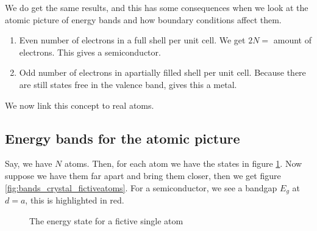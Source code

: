 We do get the same results, and this has some consequences when we look at the atomic picture of energy bands and how boundary conditions affect them.
\begin{enumerate}
	\setlength\itemsep{0pt}
	\item Even number of electrons in a full shell per unit cell. We get $2N =$ amount of electrons. This gives a semiconductor.
	\item Odd number of electrons in apartially filled shell per unit cell. Because there are still states free in the valence band, gives this a metal.
\end{enumerate}
We now link this concept to real atoms.

\subsection{Energy bands for the atomic picture}
Say, we have $N$ atoms. Then, for each atom we have the states in figure \ref{fig:state_one_atom}. Now suppose we have them far apart and bring them closer, then we get figure \ref{fig:bands_crystal_fictiveatoms}. For a semiconductor, we see a bandgap $E_g$ at $d = a$, this is highlighted in red.
\begin{figure}[h]
	\centering
	\caption{The energy state for a fictive single atom}
	\label{fig:state_one_atom}
\end{figure}
